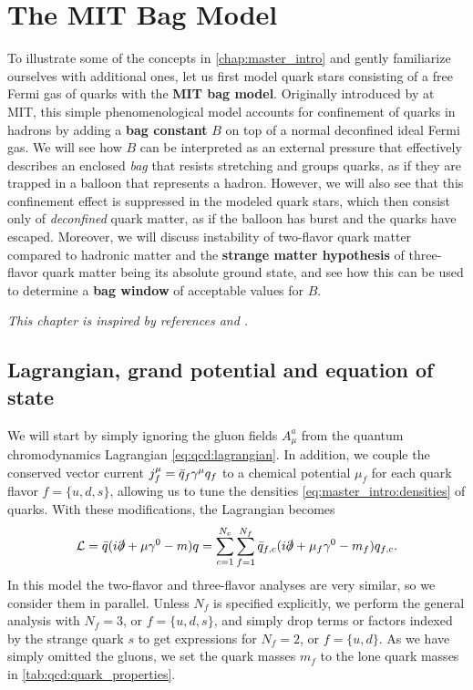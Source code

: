 \chapter{The MIT Bag Model}
\label{chap:mit}

To illustrate some of the concepts in \cref{chap:master_intro} and gently familiarize ourselves with additional ones,
let us first model quark stars consisting of a free Fermi gas of quarks with the \textbf{MIT bag model}.
Originally introduced by \cite{ref:mit_bag_model_original} at MIT,
this simple phenomenological model accounts for confinement of quarks in hadrons by adding a \textbf{bag constant} $B$ on top of a normal deconfined ideal Fermi gas.
We will see how $B$ can be interpreted as an external pressure that effectively describes an enclosed \emph{bag}
that resists stretching and groups quarks,
as if they are trapped in a balloon that represents a hadron.
However, we will also see that this confinement effect is suppressed in the modeled quark stars,
which then consist only of \emph{deconfined} quark matter,
as if the balloon has burst and the quarks have escaped.
Moreover, we will discuss instability of two-flavor quark matter compared to hadronic matter 
and the \textbf{strange matter hypothesis} of three-flavor quark matter being its absolute ground state,
and see how this can be used to determine a \textbf{bag window} of acceptable values for $B$.

\textit{This chapter is inspired by references \cite{ref:glendenning} and \cite{ref:quark_bag_model}.}

\section{Lagrangian, grand potential and equation of state}
\label{sec:mit:eos}

We will start by simply ignoring the gluon fields $A_\mu^a$ from the quantum chromodynamics Lagrangian \eqref{eq:qcd:lagrangian}.
In addition, we couple the conserved vector current $\smash{j_f^\mu} = \bar{q}_f \gamma^\mu q_f$ to a chemical potential $\mu_f$ for each quark flavor $f=\{u,d,s\}$,
allowing us to tune the densities \eqref{eq:master_intro:densities} of quarks.
With these modifications, the Lagrangian becomes
\begin{equation}
	\mathcal{L} = \bar{q} (i \slashed\partial + \mu \gamma^0 - m) q
	      = \sum_{c=1}^{N_c} \sum_{f=1}^{\smash{N_f}} \bar{q}_{f,c} (i \slashed\partial + \mu_f \gamma^0 - m_f) q_{f,c} .
\label{eq:mit:lagrangian}
\end{equation}
In this model the two-flavor and three-flavor analyses are very similar, so we consider them in parallel.
Unless $N_f$ is specified explicitly, we perform the general analysis with $N_f=3$, or $f=\{u,d,s\}$,
and simply drop terms or factors indexed by the strange quark $s$ to get expressions for $N_f = 2$, or $f=\{u,d\}$.
As we have simply omitted the gluons, we set the quark masses $m_f$ to the lone quark masses in \cref{tab:qcd:quark_properties}.

